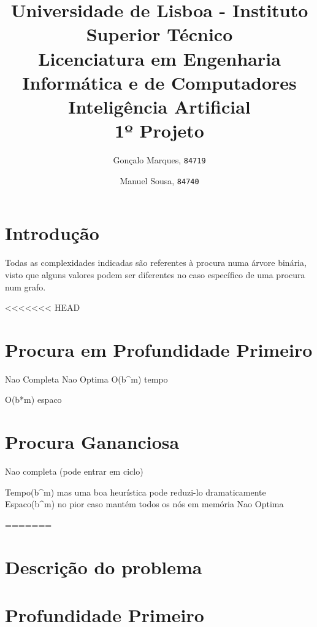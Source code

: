 \documentclass{scrartcl}
\begin{document}

\title{
	\textnormal{
	\LARGE Universidade de Lisboa - Instituto Superior Técnico\\
	\Large Licenciatura em Engenharia Informática e de Computadores\\
	\Large Inteligência Artificial
\\}
	\LARGE1º Projeto
	\vspace{-1ex}
	}
\author{Gonçalo Marques,
	\texttt{84719}
	\and
	Manuel Sousa,
	\texttt{84740}
}
\date{	\vspace{-1ex}
		\vspace{-4ex}
	}
\maketitle

\section*{Introdução}
Todas as complexidades indicadas são referentes à procura numa árvore binária,
visto que alguns valores podem ser diferentes no caso específico de uma procura
num grafo.\par

<<<<<<< HEAD
\section*{Procura em Profundidade Primeiro}
Nao Completa
Nao Optima
O(b^m) tempo \par
O(b*m) espaco

\section*{Procura Gananciosa}
Nao completa (pode entrar em ciclo)\par
Tempo(b^m) mas uma boa heurística pode reduzi-lo dramaticamente
Espaco(b^m) no pior caso mantém todos os nós em memória
Nao Optima\par

=======
\section*{Descrição do problema}

\section*{Profundidade Primeiro}
\end{document}
